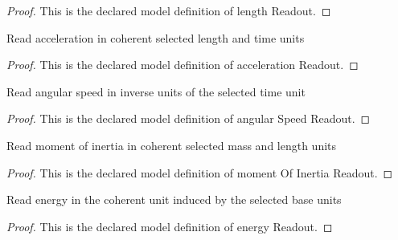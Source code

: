 \begin{proof}
  This is the declared model definition of length Readout.
\end{proof}
\begin{definition}
  \label{def:physics:phyx-mini-0782:phyxminiproblems-problemphyxmini0782-accelerationreadout}
  Read acceleration in coherent selected length and time units
\end{definition}
\begin{proof}
  This is the declared model definition of acceleration Readout.
\end{proof}
\begin{definition}
  \label{def:physics:phyx-mini-0782:phyxminiproblems-problemphyxmini0782-angularspeedreadout}
  Read angular speed in inverse units of the selected time unit
\end{definition}
\begin{proof}
  This is the declared model definition of angular Speed Readout.
\end{proof}
\begin{definition}
  \label{def:physics:phyx-mini-0782:phyxminiproblems-problemphyxmini0782-momentofinertiareadout}
  Read moment of inertia in coherent selected mass and length units
\end{definition}
\begin{proof}
  This is the declared model definition of moment Of Inertia Readout.
\end{proof}
\begin{definition}
  \label{def:physics:phyx-mini-0782:phyxminiproblems-problemphyxmini0782-energyreadout}
  Read energy in the coherent unit induced by the selected base units
\end{definition}
\begin{proof}
  This is the declared model definition of energy Readout.
\end{proof}
